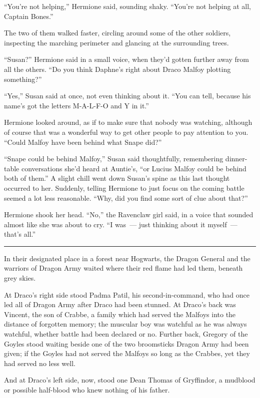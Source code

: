 ``You're not helping,'' Hermione said, sounding shaky. ``You're not helping at all, Captain Bones.''

The two of them walked faster, circling around some of the other soldiers, inspecting the marching perimeter and glancing at the surrounding trees.

``Susan?'' Hermione said in a small voice, when they'd gotten further away from all the others. ``Do you think Daphne's right about Draco Malfoy plotting something?''

``Yes,'' Susan said at once, not even thinking about it. ``You can tell, because his name's got the letters M-A-L-F-O and Y in it.''

Hermione looked around, as if to make sure that nobody was watching, although of course that was a wonderful way to get other people to pay attention to you. ``Could Malfoy have been behind what Snape did?''

``Snape could be behind Malfoy,'' Susan said thoughtfully, remembering dinner-table conversations she'd heard at Auntie's, ``or Lucius Malfoy could be behind both of them.'' A slight chill went down Susan's spine as this last thought occurred to her. Suddenly, telling Hermione to just focus on the coming battle seemed a lot less reasonable. ``Why, did you find some sort of clue about that?''

Hermione shook her head. ``No,'' the Ravenclaw girl said, in a voice that sounded almost like she was about to cry. ``I was~--- just thinking about it myself~--- that's all.''

\begin{center}\rule{3in}{0.4pt}\end{center}

In their designated place in a forest near Hogwarts, the Dragon General and the warriors of Dragon Army waited where their red flame had led them, beneath grey skies.

At Draco's right side stood Padma Patil, his second-in-command, who had once led all of Dragon Army after Draco had been stunned. At Draco's back was Vincent, the son of Crabbe, a family which had served the Malfoys into the distance of forgotten memory; the muscular boy was watchful as he was always watchful, whether battle had been declared or no. Further back, Gregory of the Goyles stood waiting beside one of the two broomsticks Dragon Army had been given; if the Goyles had not served the Malfoys so long as the Crabbes, yet they had served no less well.

And at Draco's left side, now, stood one Dean Thomas of Gryffindor, a mudblood or possible half-blood who knew nothing of his father.

